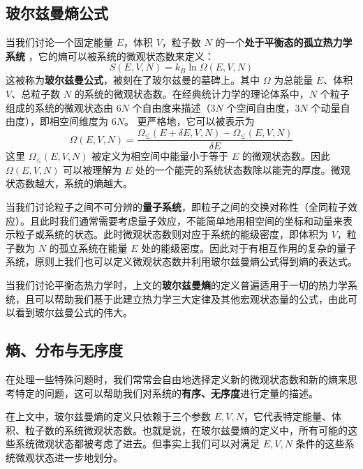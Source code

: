 

\subsection{玻尔兹曼熵公式} 
当我们讨论一个固定能量 $E$，体积 $V$，粒子数 $N$ 的一个\textbf{处于平衡态的孤立热力学系统} ，它的熵可以被系统的微观状态数来定义：
\begin{equation}
S(E,V,N) = k_B \ln \Omega(E,V,N)
\end{equation}
这被称为\textbf{玻尔兹曼公式}，被刻在了玻尔兹曼的墓碑上。其中 $\Omega$ 为总能量 $E$、体积 $V$、总粒子数 $N$ 的系统的微观状态数。在经典统计力学的理论体系中，$N$ 个粒子组成的系统的微观状态由 $6N$ 个自由度来描述（$3N$ 个空间自由度，$3N$ 个动量自由度），即相空间维度为 $6N$。
更严格地，它可以被表示为
\begin{equation}\label{eq_entro2_1}
\Omega(E,V,N)=\frac{\Omega_{\le}(E+\delta E,V,N)-\Omega_{\le}(E,V,N)}{\delta E}
\end{equation}
这里 $\Omega_{\le}(E,V,N)$ 被定义为相空间中能量小于等于 $E$ 的微观状态数。因此 $\Omega(E,V,N)$ 可以被理解为 $E$ 处的一个能壳的系统状态数除以能壳的厚度。微观状态数越大，系统的熵越大。

当我们讨论粒子之间不可分辨的\textbf{量子系统}，即粒子之间的交换对称性（全同粒子效应）。且此时我们通常需要考虑量子效应，不能简单地用相空间的坐标和动量来表示粒子或系统的状态。此时微观状态数则对应于系统的能级密度，即体积为 $V$，粒子数为 $N$ 的孤立系统在能量 $E$ 处的能级密度。因此对于有相互作用的复杂的量子系统，原则上我们也可以定义微观状态数并利用玻尔兹曼熵公式得到熵的表达式。

当我们讨论平衡态热力学时，上文的\textbf{玻尔兹曼熵}的定义普遍适用于一切的热力学系统，且可以帮助我们基于此建立热力学三大定律及其他宏观状态量的公式，由此可以看到玻尔兹曼公式的伟大。
\subsection{熵、分布与无序度}
在处理一些特殊问题时，我们常常会自由地选择定义新的微观状态数和新的熵来思考特定的问题，这可以帮助我们对系统的\textbf{有序、无序度}进行定量的描述。

在上文中，玻尔兹曼熵的定义只依赖于三个参数 $E,V,N$，它代表特定能量、体积、粒子数的系统微观状态数。也就是说，在玻尔兹曼熵的定义中，所有可能的这些系统微观状态都被考虑了进去。但事实上我们可以对满足 $E,V,N$ 条件的这些系统微观状态进一步地划分。

